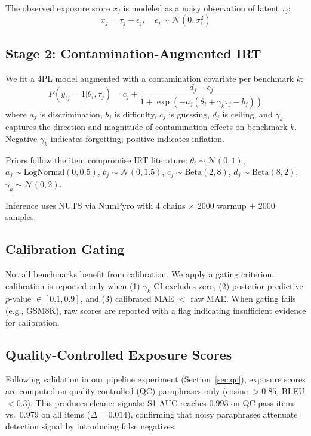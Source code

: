 \documentclass[11pt,a4paper]{article}
\newcommand{\gam}{\gamma}
\newcommand{\thet}{\theta}
\begin{document}
The observed exposure score $x_j$ is modeled as a noisy observation of latent $\tau_j$:
\begin{equation}
x_j = \tau_j + \epsilon_j, \quad \epsilon_j \sim \mathcal{N}(0, \sigma^2_\epsilon)
\end{equation}

\subsection{Stage 2: Contamination-Augmented IRT}

We fit a 4PL model augmented with a contamination covariate per benchmark $k$:
\begin{equation}
P(y_{ij}=1|\thet_i, \tau_j) = c_j + \frac{d_j - c_j}{1 + \exp(-a_j(\thet_i + \gam_k \tau_j - b_j))}
\end{equation}
where $a_j$ is discrimination, $b_j$ is difficulty, $c_j$ is guessing, $d_j$ is ceiling, and $\gam_k$ captures the direction and magnitude of contamination effects on benchmark $k$. Negative $\gam_k$ indicates forgetting; positive indicates inflation.

Priors follow the item compromise IRT literature:
$\thet_i \sim \mathcal{N}(0,1)$, $a_j \sim \text{LogNormal}(0, 0.5)$, $b_j \sim \mathcal{N}(0, 1.5)$, $c_j \sim \text{Beta}(2, 8)$, $d_j \sim \text{Beta}(8, 2)$, $\gam_k \sim \mathcal{N}(0, 2)$.

Inference uses NUTS via NumPyro with 4 chains $\times$ 2000 warmup $+$ 2000 samples.

\subsection{Calibration Gating}

Not all benchmarks benefit from calibration. We apply a gating criterion: calibration is reported only when (1) $\gam_k$ CI excludes zero, (2) posterior predictive $p$-value $\in [0.1, 0.9]$, and (3) calibrated MAE $<$ raw MAE. When gating fails (e.g., GSM8K), raw scores are reported with a flag indicating insufficient evidence for calibration.

\subsection{Quality-Controlled Exposure Scores}

Following validation in our pipeline experiment (Section~\ref{sec:qc}), exposure scores are computed on quality-controlled (QC) paraphrases only (cosine $> 0.85$, BLEU $< 0.3$). This produces cleaner signals: S1 AUC reaches 0.993 on QC-pass items vs.\ 0.979 on all items ($\Delta = 0.014$), confirming that noisy paraphrases attenuate detection signal by introducing false negatives.
\end{document}
